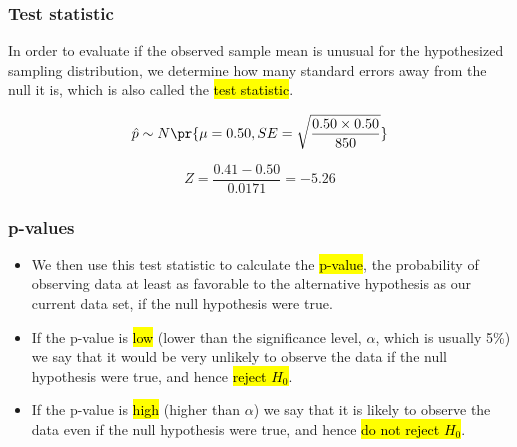 \begin{frame}
\frametitle{Test statistic}
 
In order to evaluate if the observed sample mean is unusual for the hypothesized sampling distribution, we determine how many standard errors away from the null it is, which is also called the \hl{test statistic}.
 
\pause
 
\[ \hat{p} \sim N \pr{ \mu = 0.50, SE = \sqrt{\frac{0.50 \times 0.50}{850} }  } \]

\pause

\[ Z = \frac{0.41 - 0.50}{0.0171} = -5.26 \]
 
 \pause
 
 
\pause
 
 
\end{frame}
 

\begin{frame}
\frametitle{p-values}

\begin{itemize}

\item We then use this test statistic to calculate the \hl{p-value}, the probability of observing data at least as favorable to the alternative hypothesis as our current data set, if the null hypothesis were true.

\pause

\item If the p-value is \hl{low} (lower than the significance level, $\alpha$, which is usually 5\%) we say that it would be very unlikely to observe the data if the null hypothesis were true, and hence \hl{reject $H_0$}.

\pause

\item If the p-value is \hl{high} (higher than $\alpha$) we say that it is likely to observe the data even if the null hypothesis were true, and hence \hl{do not reject $H_0$}.

\end{itemize}

\end{frame}

